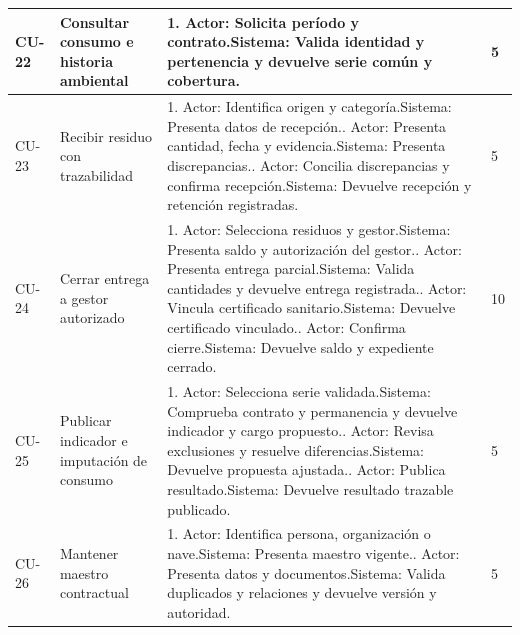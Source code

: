 \begin{longtable}{L{14mm}L{27mm}L{97mm}R{9mm}}
CU-22 & Consultar consumo e historia ambiental & 1. Actor: Solicita período y contrato.\newline Sistema: Valida identidad y pertenencia y devuelve serie común y cobertura. & 5\\\hline
CU-23 & Recibir residuo con trazabilidad & 1. Actor: Identifica origen y categoría.\newline Sistema: Presenta datos de recepción.. Actor: Presenta cantidad, fecha y evidencia.\newline Sistema: Presenta discrepancias.. Actor: Concilia discrepancias y confirma recepción.\newline Sistema: Devuelve recepción y retención registradas. & 5\\\hline
CU-24 & Cerrar entrega a gestor autorizado & 1. Actor: Selecciona residuos y gestor.\newline Sistema: Presenta saldo y autorización del gestor.. Actor: Presenta entrega parcial.\newline Sistema: Valida cantidades y devuelve entrega registrada.. Actor: Vincula certificado sanitario.\newline Sistema: Devuelve certificado vinculado.. Actor: Confirma cierre.\newline Sistema: Devuelve saldo y expediente cerrado. & 10\\\hline
CU-25 & Publicar indicador e imputación de consumo & 1. Actor: Selecciona serie validada.\newline Sistema: Comprueba contrato y permanencia y devuelve indicador y cargo propuesto.. Actor: Revisa exclusiones y resuelve diferencias.\newline Sistema: Devuelve propuesta ajustada.. Actor: Publica resultado.\newline Sistema: Devuelve resultado trazable publicado. & 5\\\hline
CU-26 & Mantener maestro contractual & 1. Actor: Identifica persona, organización o nave.\newline Sistema: Presenta maestro vigente.. Actor: Presenta datos y documentos.\newline Sistema: Valida duplicados y relaciones y devuelve versión y autoridad. & 5\\\hline

\end{longtable}
